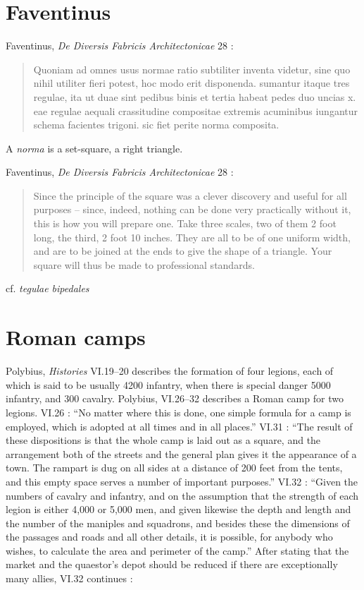 \documentclass{amsart}
\theoremstyle{definition}
\begin{document}
\section{Faventinus}
Faventinus, {\em De Diversis Fabricis Architectonicae} 28 \cite[p.~80]{plommer}:

\begin{quote}
Quoniam ad omnes usus normae ratio subtiliter inventa videtur, sine quo nihil utiliter fieri potest, hoc modo erit disponenda. sumantur itaque tres regulae, ita ut duae
sint pedibus binis et tertia habeat pedes duo uncias x. eae regulae aequali crassitudine compositae extremis acuminibus iungantur schema facientes trigoni. sic
fiet perite norma composita.
\end{quote}

A {\em norma} is a set-square, a right triangle.

Faventinus, {\em De Diversis Fabricis Architectonicae} 28 \cite[p.~81]{plommer}:

\begin{quote}
Since the principle of the square was a clever discovery and useful for all purposes -- since, indeed, nothing can be done very practically without it,
this is how you will prepare one. Take three scales, two of them 2 foot long, the third, 2 foot 10 inches. They are all to be of one uniform width, and are to be joined
at the ends to give the shape of a triangle. Your square will thus be made to professional standards.
\end{quote}

cf. {\em tegulae bipedales}






\section{Roman  camps}
Polybius, {\em Histories} VI.19--20 describes the formation of four legions, each of which is
said  to be usually 4200 infantry, when there is special danger 5000 infantry, and 300 cavalry.
Polybius,  VI.26--32 \cite[pp.~324--329, 553]{polybius} describes a Roman  camp for two legions. VI.26 \cite[p.~324]{polybius}: ``No matter where this is done, one simple formula for a camp is employed,
which is adopted at all times and in all places.''
VI.31 \cite[p.~328]{polybius}: ``The result of these dispositions is that the whole camp is laid out as a square, and the arrangement both
of the streets and the general plan gives it the appearance of a town. The rampart is dug on all sides at a distance of 200 feet from the tents, and this empty space
serves a number of important purposes.''
VI.32 \cite[p.~328]{polybius}: ``Given the numbers of cavalry and infantry, and on the assumption that the strength of each legion is either 4,000 or 5,000 men, and given
likewise the depth and length and the number of the maniples and squadrons, and besides these the dimensions of the passages and roads and all other details,
it is possible, for anybody who wishes, to calculate the area and perimeter of the camp.'' After stating that the market and the quaestor's depot should be reduced
if there are exceptionally many allies, VI.32  continues \cite[pp.~328--329]{polybius}:
\end{document}
